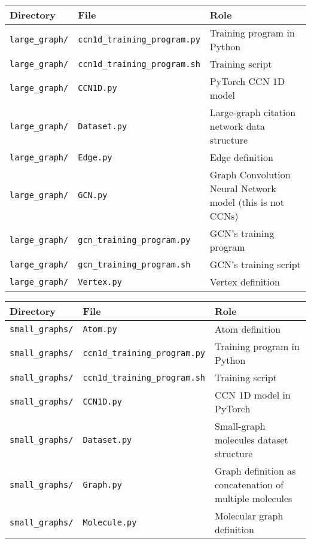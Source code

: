 \documentclass[12pt]{article}
\begin{document}
\begin{center}
\begin{tabular}{| p{} | p{} | p{} |}
\hline
\textbf{Directory} & \textbf{File} & \textbf{Role} \\
\hline
\texttt{large\_graph/}
&
\texttt{ccn1d\_training\_program.py}
&
Training program in Python
\\
\hline
\texttt{large\_graph/}
&
\texttt{ccn1d\_training\_program.sh}
&
Training script
\\
\hline
\texttt{large\_graph/}
&
\texttt{CCN1D.py}
&
PyTorch CCN 1D model
\\
\hline
\texttt{large\_graph/}
&
\texttt{Dataset.py}
&
Large-graph citation network data structure
\\
\hline
\texttt{large\_graph/}
&
\texttt{Edge.py}
&
Edge definition
\\
\hline
\texttt{large\_graph/}
&
\texttt{GCN.py}
&
Graph Convolution Neural Network model (this is not CCNs)
\\
\hline
\texttt{large\_graph/}
&
\texttt{gcn\_training\_program.py}
&
GCN's training program
\\
\hline
\texttt{large\_graph/}
&
\texttt{gcn\_training\_program.sh}
&
GCN's training script
\\
\hline
\texttt{large\_graph/}
&
\texttt{Vertex.py}
&
Vertex definition
\\
\hline
\end{tabular}
\end{center}

\begin{center}
\begin{tabular}{| p{} | p{} | p{} |}
\hline
\textbf{Directory} & \textbf{File} & \textbf{Role} \\
\hline
\texttt{small\_graphs/}
&
\texttt{Atom.py}
&
Atom definition
\\
\hline
\texttt{small\_graphs/}
&
\texttt{ccn1d\_training\_program.py}
&
Training program in Python
\\
\hline
\texttt{small\_graphs/}
&
\texttt{ccn1d\_training\_program.sh}
&
Training script
\\
\hline
\texttt{small\_graphs/}
&
\texttt{CCN1D.py}
&
CCN 1D model in PyTorch
\\
\hline
\texttt{small\_graphs/}
&
\texttt{Dataset.py}
&
Small-graph molecules dataset structure
\\
\hline
\texttt{small\_graphs/}
&
\texttt{Graph.py}
&
Graph definition as concatenation of multiple molecules
\\
\hline
\texttt{small\_graphs/}
&
\texttt{Molecule.py}
&
Molecular graph definition
\\
\hline
\end{tabular}
\end{center}
\end{document}
